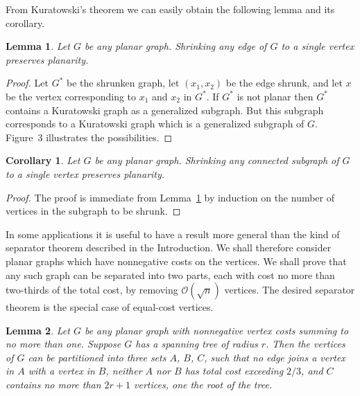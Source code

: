 \documentclass[12pt]{article}
\newtheorem{lemma}{Lemma}
\newtheorem{corollary}{Corollary}
\theoremstyle{remark}
\newcommand{\bigO}{\mathcal{O}}
\begin{document}
From Kuratowski's theorem we can easily obtain the following lemma and its corollary.

\begin{lemma}
\label{lem:shrink-edge}
Let $G$ be any planar graph. Shrinking any edge of $G$ to a single vertex preserves
planarity.
\end{lemma}

\begin{proof}
Let $G^*$ be the shrunken graph, let $(x_1, x_2)$ be the edge shrunk, and let $x$
be the vertex corresponding to $x_1$ and $x_2$ in $G^*$. If $G^*$ is not planar
then $G^*$ contains a Kuratowski graph as a generalized subgraph. But this subgraph
corresponds to a Kuratowski graph which is a generalized subgraph of $G$. Figure~3
illustrates the possibilities.
\end{proof}

\begin{corollary}
\label{cor:shrink-subgraph}
Let $G$ be any planar graph. Shrinking any connected subgraph of $G$ to a single
vertex preserves planarity.
\end{corollary}

\begin{proof}
The proof is immediate from Lemma~\ref{lem:shrink-edge} by induction on the number
of vertices in the subgraph to be shrunk.
\end{proof}

In some applications it is useful to have a result more general than the kind of
separator theorem described in the Introduction. We shall therefore consider planar
graphs which have nonnegative costs on the vertices. We shall prove that any such
graph can be separated into two parts, each with cost no more than two-thirds of the
total cost, by removing $\bigO(\sqrt{n})$ vertices. The desired separator theorem is
the special case of equal-cost vertices.

\begin{lemma}
\label{lem:radius}
Let $G$ be any planar graph with nonnegative vertex costs summing to no more than
one. Suppose $G$ has a spanning tree of radius $r$. Then the vertices of $G$ can be
partitioned into three sets $A$, $B$, $C$, such that no edge joins a vertex in $A$
with a vertex in $B$, neither $A$ nor $B$ has total cost exceeding $2/3$, and $C$
contains no more than $2r+1$ vertices, one the root of the tree.
\end{lemma}
\end{document}
